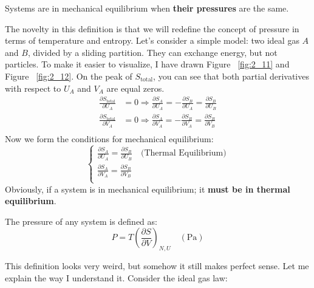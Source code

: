 \documentclass[~/PhyAI/phyai.tex]{subfiles}
\begin{document}
\begin{definition}
	\label{Definition of Mechanical Equilibrium}
	Systems are in mechanical equilibrium when \textbf{their pressures} are the same.
\end{definition}
The novelty in this definition is that we will redefine the concept of pressure in terms of temperature and entropy. Let's consider a simple model: two ideal gas $A$ and $B$, divided by a sliding partition. They can exchange energy, but not particles. To make it easier to visualize, I have drawn Figure ~\ref{fig:2_11} and Figure ~\ref{fig:2_12}. On the peak of $S_{\text{total}}$, you can see that both partial derivatives with respect to $U_{A}$ and $V_{A}$ are equal zeros.
\begin{equation*}
	\begin{split}
		\frac{\partial S_{\text{total}} }{\partial U_{A}}&=0\Rightarrow \frac{\partial S_{A}    }{\partial U_{A}}=-\frac{\partial S_{B}}{\partial U_{A}}=\frac{\partial S_{B}}{\partial U_{B}}\\
		\frac{\partial S_{\text{total}} }{\partial V_{A}}&=0\Rightarrow \frac{\partial S_{A}    }{\partial V_{A}}=-\frac{\partial S_{B}}{\partial V_{A}}=\frac{\partial S_{B}}{\partial V_{B}}\\
	\end{split}
\end{equation*}
Now we form the conditions for mechanical equilibrium:
\begin{equation*}
	\begin{cases}
		\displaystyle\frac{\partial S_{A}}{\partial U_{A}}=\displaystyle\frac{\partial S_{B}}{\partial U_{B}}\quad\text{(Thermal Equilibrium)} \\
		\displaystyle\frac{\partial S_{A}}{\partial V_{A}}=\displaystyle\frac{\partial S_{B}}{\partial V_{B}}                                  \\
	\end{cases}
\end{equation*}
Obviously, if a system is in mechanical equilibrium; it \textbf{must be in thermal equilibrium}.
\begin{definition}
	\label{The Second Definition of Pressure}
	The pressure of any system is defined as:
	$$ P=T\left(\frac{\partial S}{\partial V}\right)_{N,U}\quad(\text{Pa}) $$
\end{definition}
This definition looks very weird, but somehow it still makes perfect sense. Let me explain the way I understand it. Consider the ideal gas law:
\end{document}

